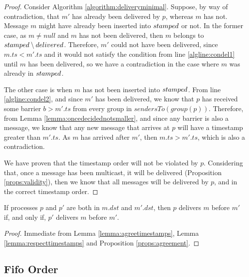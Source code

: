 \documentclass[times, 10pt]{article}
\begin{document}
\begin{proof}
Consider Algorithm \ref{algorithm:deliveryminimal}. Suppose, by way of contradiction, that $m'$ has already been delivered by $p$, whereas $m$ has not. Message $m$ might have already been inserted into $stamped$ or not. In the former case, as $m \neq null$ and $m$ has not been delivered, then $m$ belongs to $stamped \setminus delivered$. Therefore, $m'$ could not have been delivered, since $m.ts < m'.ts$ and it would not satisfy the condition from line \ref{algline:condel1} until $m$ has been delivered, so we have a contradiction in the case where $m$ was already in $stamped$.

The other case is when $m$ has not been inserted into $stamped$. From line \ref{algline:condel2}, and since $m'$ has been delivered, we know that $p$ has received some barrier $b > m'.ts$ from every group in $sendersTo(group(p))$. Therefore, from Lemma \ref{lemma:oncedecidednotsmaller}, and since any barrier is also a message, we know that any new message that arrives at $p$ will have a timestamp greater than $m'.ts$. As $m$ has arrived after $m'$, then $m.ts > m'.ts$, which is also a contradiction.

We have proven that the timestamp order will not be violated by $p$. Considering that, once a message has been multicast, it will be delivered (Proposition \ref{props:validity}), then we know that all messages will be delivered by $p$, and in the correct timestamp order.\end{proof}




\begin{props} \label{props:atomicorder}
If processes $p$ and $p'$ are both in $m.dst$ and $m'.dst$, then $p$ delivers $m$ before $m'$ if, and only if, $p'$ delivers $m$ before $m'$.
\end{props}

\begin{proof}
Immediate from Lemma \ref{lemma:agreetimestamps}, Lemma \ref{lemma:respecttimestamps} and Proposition \ref{props:agreement}.
\end{proof}



\subsection{Fifo Order}
\end{document}
